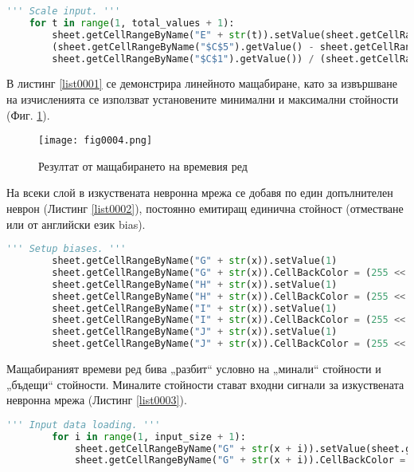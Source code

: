 \begin{lstlisting}[caption=Мащабиране на оригиналния времеви ред, language=Python, basicstyle=\tiny, label=list0001]
    ''' Scale input. '''
    for t in range(1, total_values + 1):
        sheet.getCellRangeByName("E" + str(t)).setValue(sheet.getCellRangeByName("$C$4").getValue() + 
        (sheet.getCellRangeByName("$C$5").getValue() - sheet.getCellRangeByName("$C$4").getValue()) * ((sheet.getCellRangeByName("A" + str(t)).getValue() - 
        sheet.getCellRangeByName("$C$1").getValue()) / (sheet.getCellRangeByName("$C$2").getValue() - sheet.getCellRangeByName("$C$1").getValue())))
\end{lstlisting}

В листинг \ref{list0001} се демонстрира линейното мащабиране, като за извършване на изчисленията се използват установените минимални и максимални стойности (Фиг. \ref{fig0004}). 

\begin{figure}[H]
  \centering
  \texttt{[image: fig0004.png]}
  \caption{Резултат от мащабирането на времевия ред}
\label{fig0004}
\end{figure}

На всеки слой в изкуствената невронна мрежа се добавя по един допълнителен неврон (Листинг \ref{list0002}), постоянно емитиращ единична стойност (отместване или от английски език bias).

\begin{lstlisting}[caption=Неврони емитиращи постоянно единичен сигнал, language=Python, basicstyle=\tiny, label=list0002]
        ''' Setup biases. '''
        sheet.getCellRangeByName("G" + str(x)).setValue(1)
        sheet.getCellRangeByName("G" + str(x)).CellBackColor = (255 << 16 | 255 << 8 | 0)
        sheet.getCellRangeByName("H" + str(x)).setValue(1)
        sheet.getCellRangeByName("H" + str(x)).CellBackColor = (255 << 16 | 255 << 8 | 0)
        sheet.getCellRangeByName("I" + str(x)).setValue(1)
        sheet.getCellRangeByName("I" + str(x)).CellBackColor = (255 << 16 | 255 << 8 | 0)
        sheet.getCellRangeByName("J" + str(x)).setValue(1)
        sheet.getCellRangeByName("J" + str(x)).CellBackColor = (255 << 16 | 255 << 8 | 0)
\end{lstlisting}

Мащабираният времеви ред бива „разбит“ условно на „минали“ стойности и „бъдещи“ стойности. Миналите стойности стават входни сигнали за изкуствената невронна мрежа (Листинг \ref{list0003}).

\begin{lstlisting}[caption=Формиране на входния слой, language=Python, basicstyle=\tiny, label=list0003]
        ''' Input data loading. '''
        for i in range(1, input_size + 1):
            sheet.getCellRangeByName("G" + str(x + i)).setValue(sheet.getCellRangeByName("E" + str(t + i)).getValue())
            sheet.getCellRangeByName("G" + str(x + i)).CellBackColor = (255 << 16 | 0 << 8 | 0)
\end{lstlisting}


